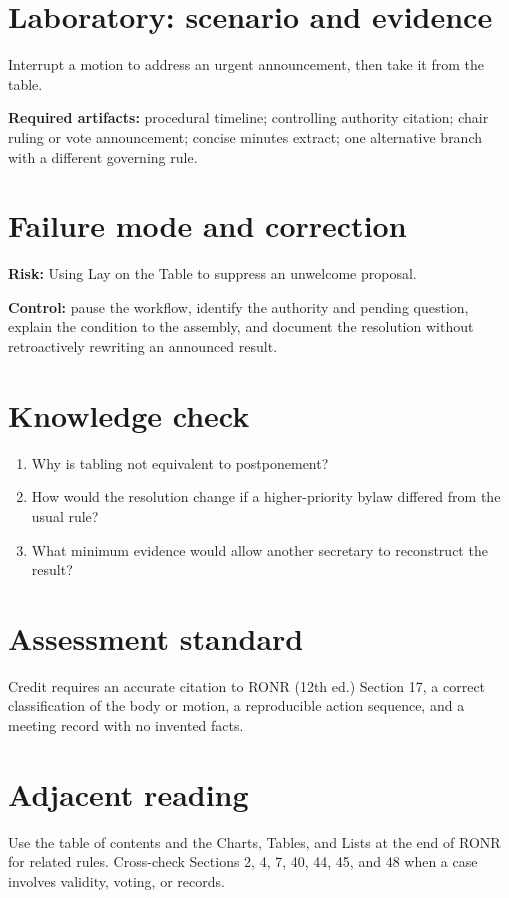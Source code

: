 \documentclass[11pt]{article}
\begin{document}
\section{Laboratory: scenario and evidence}
Interrupt a motion to address an urgent announcement, then take it from the table.

\textbf{Required artifacts:} procedural timeline; controlling authority citation; chair ruling or vote announcement; concise minutes extract; one alternative branch with a different governing rule.

\section{Failure mode and correction}
\textbf{Risk:} Using Lay on the Table to suppress an unwelcome proposal.

\textbf{Control:} pause the workflow, identify the authority and pending question, explain the condition to the assembly, and document the resolution without retroactively rewriting an announced result.

\section{Knowledge check}
\begin{enumerate}[leftmargin=*,itemsep=4pt]
\item Why is tabling not equivalent to postponement?
\item How would the resolution change if a higher-priority bylaw differed from the usual rule?
\item What minimum evidence would allow another secretary to reconstruct the result?
\end{enumerate}

\section{Assessment standard}
Credit requires an accurate citation to RONR (12th ed.) Section 17, a correct classification of the body or motion, a reproducible action sequence, and a meeting record with no invented facts.

\section{Adjacent reading}
Use the table of contents and the Charts, Tables, and Lists at the end of RONR for related rules. Cross-check Sections 2, 4, 7, 40, 44, 45, and 48 when a case involves validity, voting, or records.
\end{document}
